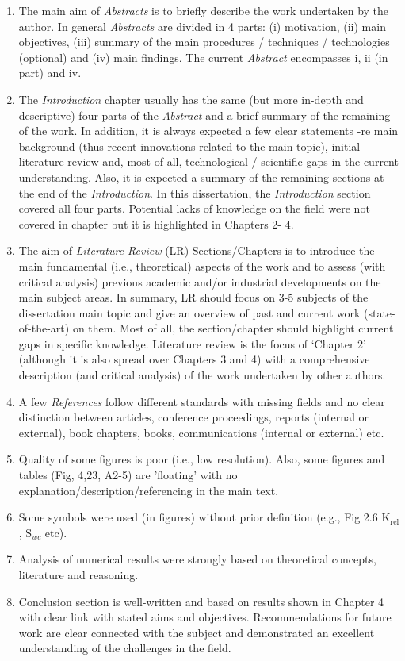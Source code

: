 \documentclass[14pt,twoside]{report}
\begin{document}
\begin{enumerate}
\item The main aim of {\it Abstracts} is to briefly describe the work undertaken by the author. In general {\it Abstracts} are divided in 4 parts: (i) motivation, (ii) main objectives, (iii) summary of the main procedures / techniques / technologies (optional) and (iv) main findings. The current {\it Abstract} encompasses i, ii (in part) and iv.
%
\item The {\it Introduction} chapter usually has the same (but more in-depth and descriptive) four parts of the {\it Abstract} and a brief summary of the remaining of the work. In addition, it is always expected a few clear statements -re main background (thus recent innovations related to the main topic), initial literature review and, most of all, technological / scientific gaps in the current understanding. Also, it is expected a summary of the remaining sections at the end of the {\it Introduction}. In this dissertation, the {\it Introduction} section covered all four parts.  Potential lacks of knowledge on the field were not covered in chapter but it is highlighted in Chapters 2- 4. 
%
\item The aim of {\it Literature Review} (LR) Sections/Chapters is to introduce the main fundamental (i.e., theoretical) aspects of the work and to assess (with critical analysis) previous academic and/or industrial developments on the main subject areas. In summary, LR should focus on 3-5 subjects of the dissertation main topic and give an overview of past and current work (state-of-the-art) on them. Most of all, the section/chapter should highlight current gaps in specific knowledge. Literature review is the focus of `Chapter 2' (although it is also spread over Chapters 3 and 4) with a comprehensive description (and critical analysis) of the work undertaken by other authors. 
%
\item A few {\it References} follow different standards with missing fields and no clear distinction between articles, conference proceedings, reports (internal or external), book chapters, books, communications (internal or external) etc.  
%
\item Quality of some figures is poor (i.e., low resolution). Also, some figures and tables (Fig, 4,23, A2-5) are 'floating' with no explanation/description/referencing in the main text.
%
\item Some symbols were used (in figures) without prior definition (e.g., Fig 2.6 K$_{\text{rel}}$, S$_{wc}$ etc).
%
\item Analysis of numerical results were strongly based on theoretical concepts, literature and reasoning. 
%
\item Conclusion section is well-written and based on results shown in Chapter 4 with clear link with stated aims and objectives. Recommendations for future work are clear connected with the subject and demonstrated an excellent understanding of the challenges in the field. 
% 
\end{enumerate}
\end{document}
